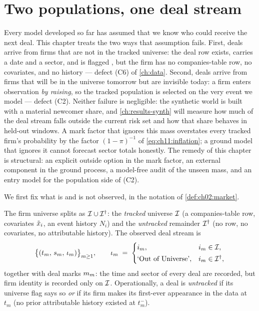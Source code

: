 
\section{Two populations, one deal stream}\label{ch11:sec:populations}

Every model developed so far has assumed that we know who could
receive the next deal. This chapter treats the two ways that assumption
fails. First, deals arrive from firms that are not in the tracked
universe: the deal row exists, carries a date and a sector, and is flagged
, but the firm has no
companies-table row, no covariates, and no history --- defect (C6) of
\cref{ch:data}. Second, deals arrive from firms that will be in the
universe tomorrow but are invisible today: a firm enters observation
\emph{by raising}, so the tracked population is selected on the very event
we model --- defect (C2). Neither failure is negligible: the synthetic
world is built with a material newcomer share, and
\cref{ch:results-synth} will measure how much of the deal stream falls
outside the current risk set and how that share behaves in held-out
windows. A mark factor that ignores this mass overstates every tracked
firm's probability by the factor $(1-\pi)^{-1}$ of
\cref{eq:ch11:inflation}; a ground model that ignores it cannot
forecast sector totals honestly. The remedy of this chapter is
structural: an explicit outside option in the mark factor, an external
component in the ground process, a model-free audit of the unseen mass,
and an entry model for the population side of (C2).

We first fix what is and is not observed, in the notation of
\cref{def:ch02:market}.

\begin{definition}\label{def:ch11:universes}
The firm universe splits as $\mathcal{I} \cup \mathcal{I}^{\dagger}$: the
\emph{tracked} universe $\mathcal{I}$ (a companies-table row, covariates
$\tilde{x}_i$, an event history $N_i$) and the \emph{untracked}
remainder $\mathcal{I}^{\dagger}$ (no row, no covariates, no attributable
history). The observed deal stream is
\begin{equation}\label{eq:ch11:observed}
\big\{(t_m,\, s_m,\, \iota_m)\big\}_{m\ge 1},
\qquad
\iota_m \;=\;
\begin{cases}
i_m, & i_m \in \mathcal{I},\\[2pt]
\text{`Out of Universe'}, & i_m \in \mathcal{I}^{\dagger},
\end{cases}
\end{equation}
together with deal marks $m_m$: the time and sector of every deal are
recorded, but firm identity is recorded only on $\mathcal{I}$. Operationally, a
deal is \emph{untracked} if its universe flag says so \emph{or} if its
firm makes its first-ever appearance in the data at $t_m$ (no prior
attributable history existed at $t_m^-$).
\end{definition}

